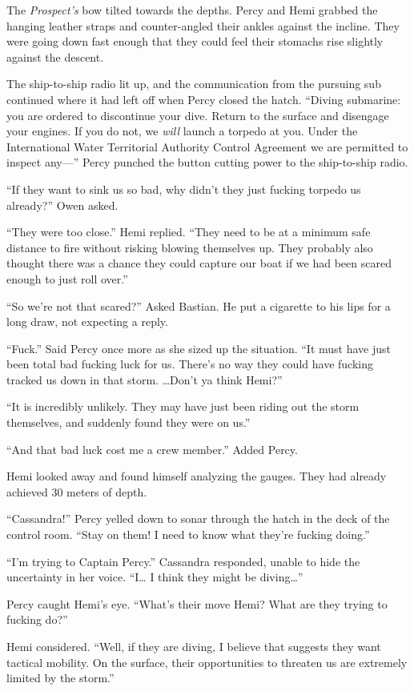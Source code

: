 \documentclass[
]{scrbook}
\begin{document}
The \emph{Prospect's} bow tilted towards the depths. Percy and Hemi
grabbed the hanging leather straps and counter-angled their ankles
against the incline. They were going down fast enough that they could
feel their stomachs rise slightly against the descent.

The ship-to-ship radio lit up, and the communication from the pursuing
sub continued where it had left off when Percy closed the hatch.
``Diving submarine: you are ordered to discontinue your dive. Return to
the surface and disengage your engines. If you do not, we \emph{will}
launch a torpedo at you. Under the International Water Territorial
Authority Control Agreement we are permitted to inspect any---'' Percy
punched the button cutting power to the ship-to-ship radio.

``If they want to sink us so bad, why didn't they just fucking torpedo
us already?'' Owen asked.

``They were too close.'' Hemi replied. ``They need to be at a minimum
safe distance to fire without risking blowing themselves up. They
probably also thought there was a chance they could capture our boat if
we had been scared enough to just roll over.''

``So we're not that scared?'' Asked Bastian. He put a cigarette to his
lips for a long draw, not expecting a reply.

``Fuck.'' Said Percy once more as she sized up the situation. ``It must
have just been total bad fucking luck for us. There's no way they could
have fucking tracked us down in that storm. \ldots Don't ya think
Hemi?''

``It is incredibly unlikely. They may have just been riding out the
storm themselves, and suddenly found they were on us.''

``And that bad luck cost me a crew member.'' Added Percy.

Hemi looked away and found himself analyzing the gauges. They had
already achieved 30 meters of depth.

``Cassandra!'' Percy yelled down to sonar through the hatch in the deck
of the control room. ``Stay on them! I need to know what they're fucking
doing.''

``I'm trying to Captain Percy.'' Cassandra responded, unable to hide the
uncertainty in her voice. ``I\ldots{} I think they might be
diving\ldots{}''

Percy caught Hemi's eye. ``What's their move Hemi? What are they trying
to fucking do?''

Hemi considered. ``Well, if they are diving, I believe that suggests
they want tactical mobility. On the surface, their opportunities to
threaten us are extremely limited by the storm.''
\end{document}
